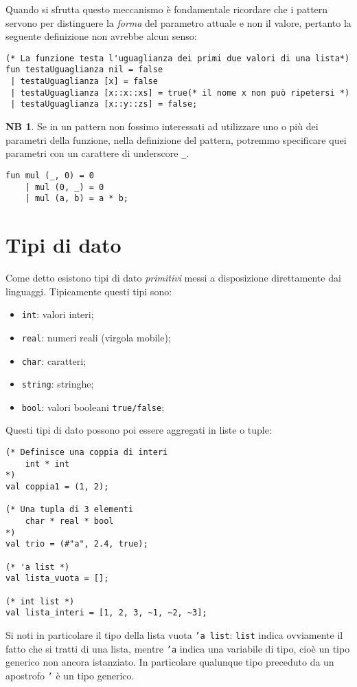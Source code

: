 \documentclass[12pt, a4paper]{report}
\theoremstyle{definition}
\newtheorem*{note}{NB}
\newcommand{\code}[1]{\texttt{#1}}
\begin{document}
Quando si sfrutta questo meccanismo è fondamentale ricordare che i pattern servono
per distinguere la \emph{forma} del parametro attuale e non il valore, pertanto
la seguente definizione non avrebbe alcun senso:
\begin{lstlisting}
(* La funzione testa l'uguaglianza dei primi due valori di una lista*)
fun testaUguaglianza nil = false
 | testaUguaglianza [x] = false
 | testaUguaglianza [x::x::xs] = true(* il nome x non può ripetersi *)
 | testaUguaglianza [x::y::zs] = false;
\end{lstlisting}
\begin{note}
    Se in un pattern non fossimo interessati ad utilizzare uno o più dei parametri
    della funzione, nella definizione del pattern, potremmo specificare quei
    parametri con un carattere di underscore \code{\_}.
\begin{lstlisting}
fun mul (_, 0) = 0
    | mul (0, _) = 0
    | mul (a, b) = a * b;
\end{lstlisting}
\end{note}

\section{Tipi di dato}
Come detto esistono tipi di dato \emph{primitivi} messi a disposizione direttamente
dai linguaggi. Tipicamente questi tipi sono:
\begin{itemize}
    \item \code{int}: valori interi;
    \item \code{real}: numeri reali (virgola mobile);
    \item \code{char}: caratteri;
    \item \code{string}: stringhe;
    \item \code{bool}: valori booleani \code{true/false};
\end{itemize}
Questi tipi di dato possono poi essere aggregati in liste o tuple:
\begin{lstlisting}
(* Definisce una coppia di interi
    int * int
*)
val coppia1 = (1, 2);

(* Una tupla di 3 elementi
    char * real * bool
*)
val trio = (#"a", 2.4, true);

(* 'a list *)
val lista_vuota = [];

(* int list *)
val lista_interi = [1, 2, 3, ~1, ~2, ~3];
\end{lstlisting}

Si noti in particolare il tipo della lista vuota \code{'a list}: \code{list}
indica ovviamente il fatto che si tratti di una lista, mentre \code{'a} indica
una variabile di tipo, cioè un tipo generico non ancora istanziato. In particolare
qualunque tipo preceduto da un apostrofo \code{'} è un tipo generico.
\end{document}
